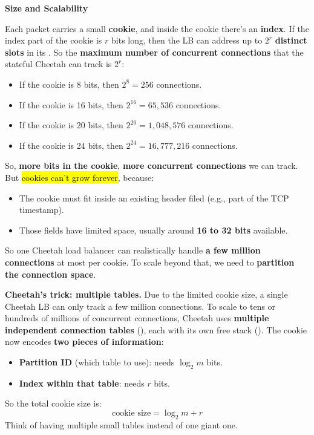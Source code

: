 \begin{flushleft}
    \textcolor{Green3}{ \textbf{Size and Scalability}}
\end{flushleft}
Each packet carries a small \textbf{cookie}, and inside the cookie there's an \textbf{index}. If the index part of the cookie is $r$ bits long, then the LB can address up to $2^r$ \textbf{distinct slots} in its . So the \textbf{maximum number of concurrent connections} that the stateful Cheetah can track is $2^r$:
\begin{itemize}
    \item If the cookie is 8 bits, then $2^{8} = 256$ connections.
    \item If the cookie is 16 bits, then $2^{16} = 65,536$ connections.
    \item If the cookie is 20 bits, then $2^{20} = 1,048,576$ connections.
    \item If the cookie is 24 bits, then $2^{24} = 16,777,216$ connections.
\end{itemize}
So, \textbf{more bits in the cookie}, \textbf{more concurrent connections} we can track. But \hl{cookies can't grow forever}, because:
\begin{itemize}
    \item The cookie must fit inside an existing header filed (e.g., part of the TCP timestamp).
    \item Those fields have limited space, usually around \textbf{16 to 32 bits} available.
\end{itemize}
So one Cheetah load balancer can realistically handle \textbf{a few million connections} at most per cookie. To scale beyond that, we need to \textbf{partition the connection space}.

\highspace
\textcolor{Green3}{ \textbf{Cheetah's trick: multiple tables.}} Due to the limited cookie size, a single Cheetah LB can only track a few million connections. To scale to tens or hundreds of millions of concurrent connections, Cheetah uses \textbf{multiple independent connection tables} (), each with its own free stack (). The cookie now encodes \textbf{two pieces of information}:
\begin{itemize}
    \item \textbf{Partition ID} (which table to use): needs $\log_{2} m$ bits.
    \item \textbf{Index within that table}: needs $r$ bits.
\end{itemize}
So the total cookie size is:
\begin{equation}
    \text{cookie size} = \log_{2} m + r
\end{equation}
Think of having multiple small tables instead of one giant one.

